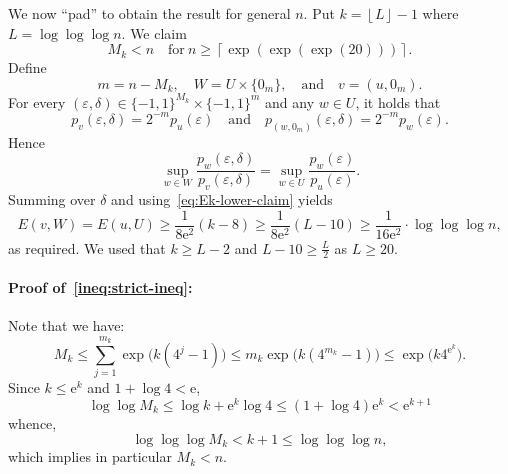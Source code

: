 \documentclass[11pt, letterpaper, hidelinks]{article}
\makeatletter
\renewcommand{\proofname}{\textit{\textbf{Proof}}}
\renewenvironment{proof}[1][\proofname]{\par\pushQED{\qed}\normalfont \topsep6\p@\@plus6\p@\relax\trivlist\item[\hskip\labelsep#1\@addpunct{}]\ignorespaces}{\popQED\endtrivlist\@endpefalse}
\newcommand{\ceil}[1]{\left\lceil #1 \right\rceil}
\newcommand{\floor}[1]{\left\lfloor #1 \right\rfloor}
\newcommand{\e}{\mathrm{e}}
\newcommand{\1}{\mathbf 1}
\newcommand{\eps}{\varepsilon}
\renewcommand{\leq}{\leqslant}
\renewcommand{\geq}{\geqslant}
\theoremstyle{plain}
\theoremstyle{definition}
\makeatother
\begin{document}
\begin{proof}[Proof of~\Cref{prop:d2-logloglog-lower}]
We now ``pad'' to obtain the result for general $n$. Put $k = \floor{L} - 1$ where $L = \log \log \log n$. We claim 
\begin{equation}
\label{ineq:strict-ineq}
M_k < n \quad \mbox{for}~n \geq \ceil{\exp(\exp(\exp(20)))}.
\end{equation}
Define
\[
m = n- M_k, \quad W = U \times \{0_m\},
\quad \text{and} \quad
v = (u, 0_{m}).
\]
For every $(\eps,\delta)\in \{-1,1\}^{M_k}\times \{-1,1\}^{m}$ and any $w \in U$, it holds that
\[
p_{v}(\eps,\delta)
=
2^{-m}p_u(\eps)
\quad \mbox{and} \quad 
p_{(w,0_m)}(\eps,\delta)
=
2^{-m}p_w(\eps).
\]
Hence
\[
\sup_{ w\in W}
\frac{p_{ w}(\eps,\delta)}{p_{v}(\eps,\delta)}
=
\sup_{w\in U}
\frac{p_w(\eps)}{p_u(\eps)}.
\]
Summing over \(\delta\) and using~\cref{eq:Ek-lower-claim} yields
\[
E(v,W)=E(u,U)
\geq
\frac{1}{8\e^2} (k-8) \geq 
\frac{1}{8\e^2}(L - 10) 
\geq 
\frac{1}{16 \e^2} \cdot \log \log \log n,
\]
as required. We used that $k \geq L -2$ and $L - 10 \geq \tfrac{L}{2}$ as $L \geq 20$.

\paragraph{Proof of~\cref{ineq:strict-ineq}:}
Note that we have:
\[
M_k
\leq
\sum_{j=1}^{m_k} \exp\big(k(4^j-1)\big)
\leq
m_k \exp\big(k(4^{m_k}-1)\big)
\leq
\exp\big(k4^{\e^k}\big).
\]
Since $k \leq \e^k$ and $1+\log 4 < \e$,
\[
\log\log M_k \leq \log k + \e^k \log 4 \leq (1+\log 4)\e^k < \e^{k+1}
\]
whence,
\[
\log \log \log M_k < k + 1 \leq \log \log \log n,
\]
which implies in particular $M_k < n$.

\end{proof}
\end{document}
